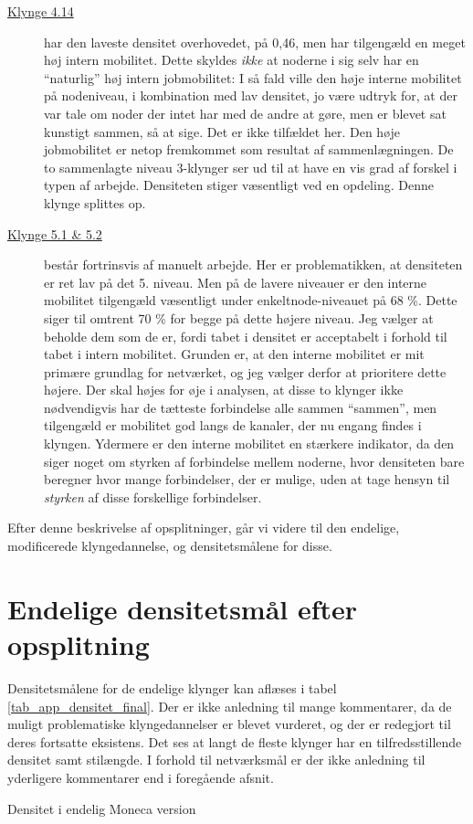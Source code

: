 \begin{description}
    \item[\underline{Klynge 4.14}] har den laveste densitet overhovedet, på 0,46, men har tilgengæld en meget høj intern mobilitet. Dette skyldes \emph{ikke} at noderne i sig selv har en “naturlig” høj intern jobmobilitet: I så fald ville den høje interne mobilitet på nodeniveau, i kombination med lav densitet, jo være udtryk for, at der  var tale om noder der intet har med de andre at gøre, men er blevet sat kunstigt sammen, så at sige. Det er ikke tilfældet her. Den høje jobmobilitet er netop fremkommet som resultat af sammenlægningen. De to sammenlagte niveau 3-klynger ser ud til at have en vis grad af forskel i typen af arbejde. Densiteten stiger væsentligt ved en opdeling. Denne klynge splittes op. 

    \item[\underline{Klynge 5.1 \& 5.2}] består fortrinsvis af manuelt arbejde. Her er problematikken, at densiteten er ret lav på det 5. niveau. Men på de lavere niveauer er den interne mobilitet tilgengæld væsentligt under enkeltnode-niveauet på 68 \%. Dette siger til omtrent 70 \% for begge på dette højere niveau. Jeg vælger at beholde dem som de er, fordi tabet i densitet er acceptabelt i forhold til tabet i intern mobilitet. Grunden er, at den interne mobilitet er mit primære grundlag for netværket, og jeg vælger derfor at prioritere dette højere. Der skal højes for øje i analysen, at disse to klynger ikke nødvendigvis har de tætteste forbindelse alle sammen “sammen”, men tilgengæld er mobilitet god langs de kanaler, der nu engang findes i klyngen. Ydermere er den interne mobilitet en stærkere indikator, da den siger noget om styrken af forbindelse mellem noderne, hvor densiteten bare beregner hvor mange forbindelser, der er mulige, uden at tage hensyn til \emph{styrken} af disse forskellige forbindelser. 

\end{description}
% 
Efter denne beskrivelse af opsplitninger, går vi videre til den endelige, modificerede klyngedannelse, og densitetsmålene for disse. 

%
\section{Endelige densitetsmål efter opsplitning}
%

Densitetsmålene for de endelige klynger kan aflæses i tabel \ref{tab_app_densitet_final}. Der er ikke anledning til mange kommentarer, da de muligt problematiske klyngedannelser er blevet vurderet, og der er redegjort til deres fortsatte eksistens. Det ses at langt de fleste klynger har en tilfredsstillende densitet samt stilængde. I forhold til netværksmål er der ikke anledning til yderligere kommentarer end i foregående afsnit. 
%
\begin{table}[H]
  \centering
    \resizebox{5cm}{!}{%

}
  \caption{Densitet i endelig Moneca version}
  \label{tab_app_densitet_final}%
\end{table}
%
